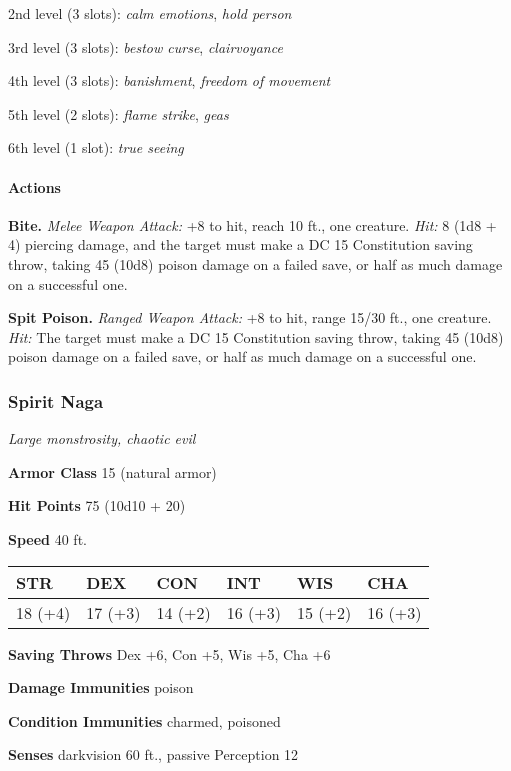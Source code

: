\documentclass[
]{article}
\begin{document}
2nd level (3 slots): \emph{calm emotions}, \emph{hold person}

3rd level (3 slots): \emph{bestow curse}, \emph{clairvoyance}

4th level (3 slots): \emph{banishment}, \emph{freedom of movement}

5th level (2 slots): \emph{flame strike}, \emph{geas}

6th level (1 slot): \emph{true seeing}

\hypertarget{actions}{%
\paragraph{Actions}\label{actions}}

\textbf{Bite.} \emph{Melee Weapon Attack:} +8 to hit, reach 10 ft., one
creature. \emph{Hit:} 8 (1d8 + 4) piercing damage, and the target must
make a DC 15 Constitution saving throw, taking 45 (10d8) poison damage
on a failed save, or half as much damage on a successful one.

\textbf{Spit Poison.} \emph{Ranged Weapon Attack:} +8 to hit, range
15/30 ft., one creature. \emph{Hit:} The target must make a DC 15
Constitution saving throw, taking 45 (10d8) poison damage on a failed
save, or half as much damage on a successful one.

\hypertarget{spirit-naga}{%
\subsubsection{Spirit Naga}\label{spirit-naga}}

\emph{Large monstrosity, chaotic evil}

\textbf{Armor Class} 15 (natural armor)

\textbf{Hit Points} 75 (10d10 + 20)

\textbf{Speed} 40 ft.

\begin{longtable}[]{@{}llllll@{}}
\toprule
STR & DEX & CON & INT & WIS & CHA\tabularnewline
\midrule
\endhead
18 (+4) & 17 (+3) & 14 (+2) & 16 (+3) & 15 (+2) & 16 (+3)\tabularnewline
\bottomrule
\end{longtable}

\textbf{Saving Throws} Dex +6, Con +5, Wis +5, Cha +6

\textbf{Damage Immunities} poison

\textbf{Condition Immunities} charmed, poisoned

\textbf{Senses} darkvision 60 ft., passive Perception 12
\end{document}
